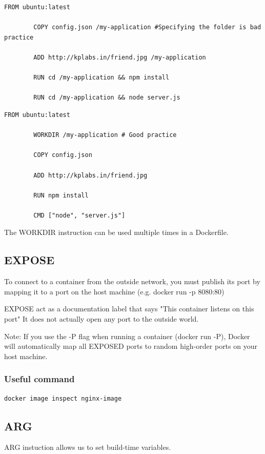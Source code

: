 \documentclass[11pt]{book}
\begin{document}
    \begin{lstlisting}[style=dockerstyle,caption={Example Dockerfile}]
        FROM ubuntu:latest

        COPY config.json /my-application #Specifying the folder is bad practice

        ADD http://kplabs.in/friend.jpg /my-application

        RUN cd /my-application && npm install

        RUN cd /my-application && node server.js
    \end{lstlisting}

    \begin{lstlisting}[style=dockerstyle,caption={Example Dockerfile}]
        FROM ubuntu:latest

        WORKDIR /my-application # Good practice

        COPY config.json

        ADD http://kplabs.in/friend.jpg

        RUN npm install

        CMD ["node", "server.js"]
    \end{lstlisting}

    The WORKDIR instruction can be used multiple times in a Dockerfile.

    \subsection{EXPOSE}
    To connect to a container from the outside network, you must publish its port by mapping it to a port on the host machine (e.g. docker run -p 8080:80)

    EXPOSE act as a documentation label that says "This container listens on this port"
    It does not actually open any port to the outside world.

    Note:
    If you use the -P flag when running a container (docker run -P), Docker will automatically map all EXPOSED ports to random high-order ports on your host machine.

    \subsubsection{Useful command}
    \begin{lstlisting}[style=terminal]
        docker image inspect nginx-image
    \end{lstlisting}

    \subsection{ARG}
    ARG instuction allows us to set build-time variables.
\end{document}
